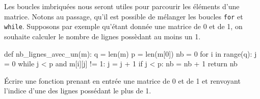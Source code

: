 \documentclass{magnolia}
\begin{document}
Les boucles imbriquées nous seront utiles pour parcourir les éléments d'une matrice. Notons au
passage, qu'il est possible de mélanger les boucles \verb!for! et \verb!while!.
Supposons par exemple qu'étant donnée une matrice de 0 et de 1, on souhaite calculer le
nombre de lignes possèdant au moins un 1.

\begin{pythoncodeline}
def nb_lignes_avec_un(m):
    q = len(m)
    p = len(m[0])
    nb = 0
    for i in range(q):
        j = 0
        while j < p and m[i][j] != 1:
            j = j + 1
        if j < p:
            nb = nb + 1
    return nb
\end{pythoncodeline}

\begin{exoUnique}
\exo Écrire une fonction prenant en entrée une matrice de 0 et de 1
  et renvoyant l'indice d'une des lignes possédant le plus de 1.
\end{exoUnique}




                
 
 
 
                









\end{document}
